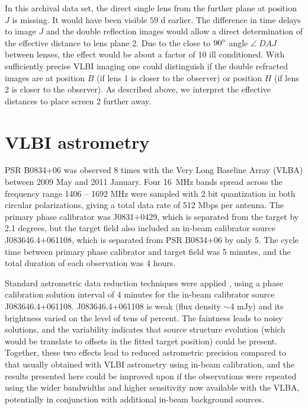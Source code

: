\documentclass[useAMS,usenatbib]{mn2e}
\begin{document}

In this archival data set, the direct single lens from the further
plane at position $J$ is missing.  It would have been visible $59$ d
earlier. The difference in time delays to image $J$ and the double
reflection images would allow a direct determination of the effective
distance to lens plane 2.  Due to the close to $90 \degree$ angle $\angle~DAJ$
between lenses, the effect would be about a factor of 10 ill
conditioned.  With sufficiently precise VLBI imaging one could
distinguish if the double refracted images are at position $B$ (if
lens 1 is closer to the observer) or position $H$ (if lens 2 is closer to the observer).  As described above, we interpret
the effective distances to place screen 2 further away.


\section{VLBI astrometry}
\label{sec:astrometry}

PSR B0834+06 was observed 8 times with the Very Long Baseline Array (VLBA) between 2009 May and 2011 January.  Four 16~MHz bands spread across the frequency range 1406 -- 1692 MHz were sampled with 2 bit quantization in both circular polarizations, giving a total data rate of 512 Mbps per antenna.  The primary phase calibrator was J0831+0429, which is separated from the target by 2.1 degrees, but the target field also included an in-beam calibrator source J083646.4+061108, which is separated from PSR B0834+06 by only 5\arcmin.  The cycle time between primary phase calibrator and target field was 5 minutes, and the total duration of each observation was 4 hours.

Standard astrometric data reduction techniques were applied
\citep[e.g.,][]{deller12b,deller13a}, using a phase calibration
solution interval of 4 minutes for the in-beam calibrator source
J083646.4+061108.  J083646.4+061108 is weak (flux density $\sim$4 mJy)
and its brightness varied on the level of tens of percent.  The
faintness leads to noisy solutions, and the variability indicates that
source structure evolution (which would be translate to offsets in the
fitted target position) could be present.  Together, these two effects
lead to reduced astrometric precision compared to that usually
obtained with VLBI astrometry using in-beam calibration, and the
results presented here could be improved upon if the observations were
repeated using the wider bandwidths and higher sensitivity now
available with the VLBA, potentially in conjunction with additional
in-beam background sources.
\end{document}
